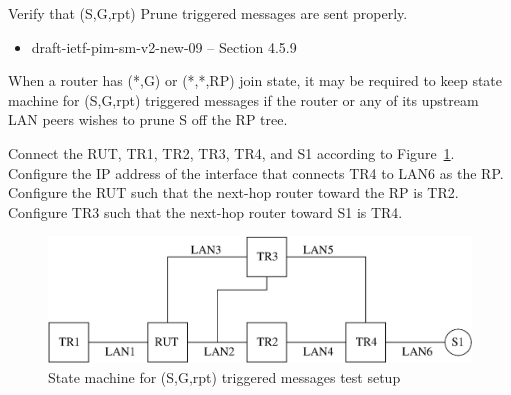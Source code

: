 \documentclass[11pt]{report}
\begin{document}
Verify that (S,G,rpt) Prune triggered messages are sent properly.

\begin{itemize}
  \item draft-ietf-pim-sm-v2-new-09 -- Section 4.5.9
\end{itemize}

When a router has (*,G) or (*,*,RP) join state, it may be required to keep
state machine for (S,G,rpt) triggered messages if the router or any of its
upstream LAN peers wishes to prune S off the RP tree.

Connect the RUT, TR1, TR2, TR3, TR4, and S1 according to
Figure~\ref{fig:pim_test_4_9_state_machine_for_sg_rpt_triggered_messages}.
Configure the IP address of the interface that connects TR4 to LAN6 as the RP.
Configure the RUT such that the next-hop router toward the RP is TR2.
Configure TR3 such that the next-hop router toward S1 is TR4.

\begin{figure}[htbp]
  \begin{center}
    \includegraphics[scale=0.8]{figs/pim_test_4_9_state_machine_for_sg_rpt_triggered_messages}
    \caption{State machine for (S,G,rpt) triggered messages test setup}
    \label{fig:pim_test_4_9_state_machine_for_sg_rpt_triggered_messages}
  \end{center}
\end{figure}


\end{document}
